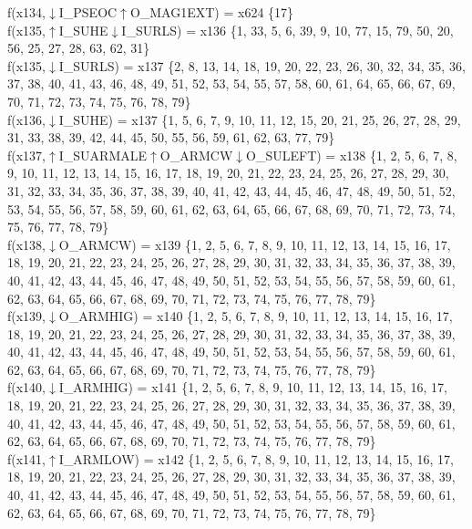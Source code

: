 f(x134,$\downarrow$I\_PSEOC$\uparrow$O\_MAG1EXT) = x624 \{17\} \\  
f(x135,$\uparrow$I\_SUHE$\downarrow$I\_SURLS) = x136 \{1, 33, 5, 6, 39, 9, 10, 77, 15, 79, 50, 20, 56, 25, 27, 28, 63, 62, 31\} \\  
f(x135,$\downarrow$I\_SURLS) = x137 \{2, 8, 13, 14, 18, 19, 20, 22, 23, 26, 30, 32, 34, 35, 36, 37, 38, 40, 41, 43, 46, 48, 49, 51, 52, 53, 54, 55, 57, 58, 60, 61, 64, 65, 66, 67, 69, 70, 71, 72, 73, 74, 75, 76, 78, 79\} \\  
f(x136,$\downarrow$I\_SUHE) = x137 \{1, 5, 6, 7, 9, 10, 11, 12, 15, 20, 21, 25, 26, 27, 28, 29, 31, 33, 38, 39, 42, 44, 45, 50, 55, 56, 59, 61, 62, 63, 77, 79\} \\  
f(x137,$\uparrow$I\_SUARMALE$\uparrow$O\_ARMCW$\downarrow$O\_SULEFT) = x138 \{1, 2, 5, 6, 7, 8, 9, 10, 11, 12, 13, 14, 15, 16, 17, 18, 19, 20, 21, 22, 23, 24, 25, 26, 27, 28, 29, 30, 31, 32, 33, 34, 35, 36, 37, 38, 39, 40, 41, 42, 43, 44, 45, 46, 47, 48, 49, 50, 51, 52, 53, 54, 55, 56, 57, 58, 59, 60, 61, 62, 63, 64, 65, 66, 67, 68, 69, 70, 71, 72, 73, 74, 75, 76, 77, 78, 79\} \\  
f(x138,$\downarrow$O\_ARMCW) = x139 \{1, 2, 5, 6, 7, 8, 9, 10, 11, 12, 13, 14, 15, 16, 17, 18, 19, 20, 21, 22, 23, 24, 25, 26, 27, 28, 29, 30, 31, 32, 33, 34, 35, 36, 37, 38, 39, 40, 41, 42, 43, 44, 45, 46, 47, 48, 49, 50, 51, 52, 53, 54, 55, 56, 57, 58, 59, 60, 61, 62, 63, 64, 65, 66, 67, 68, 69, 70, 71, 72, 73, 74, 75, 76, 77, 78, 79\} \\  
f(x139,$\downarrow$O\_ARMHIG) = x140 \{1, 2, 5, 6, 7, 8, 9, 10, 11, 12, 13, 14, 15, 16, 17, 18, 19, 20, 21, 22, 23, 24, 25, 26, 27, 28, 29, 30, 31, 32, 33, 34, 35, 36, 37, 38, 39, 40, 41, 42, 43, 44, 45, 46, 47, 48, 49, 50, 51, 52, 53, 54, 55, 56, 57, 58, 59, 60, 61, 62, 63, 64, 65, 66, 67, 68, 69, 70, 71, 72, 73, 74, 75, 76, 77, 78, 79\} \\  
f(x140,$\downarrow$I\_ARMHIG) = x141 \{1, 2, 5, 6, 7, 8, 9, 10, 11, 12, 13, 14, 15, 16, 17, 18, 19, 20, 21, 22, 23, 24, 25, 26, 27, 28, 29, 30, 31, 32, 33, 34, 35, 36, 37, 38, 39, 40, 41, 42, 43, 44, 45, 46, 47, 48, 49, 50, 51, 52, 53, 54, 55, 56, 57, 58, 59, 60, 61, 62, 63, 64, 65, 66, 67, 68, 69, 70, 71, 72, 73, 74, 75, 76, 77, 78, 79\} \\  
f(x141,$\uparrow$I\_ARMLOW) = x142 \{1, 2, 5, 6, 7, 8, 9, 10, 11, 12, 13, 14, 15, 16, 17, 18, 19, 20, 21, 22, 23, 24, 25, 26, 27, 28, 29, 30, 31, 32, 33, 34, 35, 36, 37, 38, 39, 40, 41, 42, 43, 44, 45, 46, 47, 48, 49, 50, 51, 52, 53, 54, 55, 56, 57, 58, 59, 60, 61, 62, 63, 64, 65, 66, 67, 68, 69, 70, 71, 72, 73, 74, 75, 76, 77, 78, 79\} \\  
